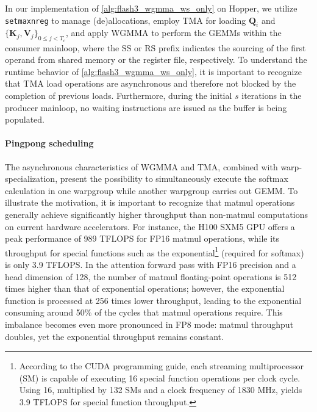 In our implementation of \cref{alg:flash3_wgmma_ws_only} on Hopper, we utilize \verb|setmaxnreg| to manage (de)allocations, employ TMA for loading $\mathbf{Q}_i$ and $\{ \mathbf{K}_j, \mathbf{V}_j \}_{0 \leq j < T_c}$, and apply WGMMA to perform the GEMMs within the consumer mainloop, where the SS or RS prefix indicates the sourcing of the first operand from shared memory or the register file, respectively. To understand the runtime behavior of \cref{alg:flash3_wgmma_ws_only}, it is important to recognize that TMA load operations are asynchronous and therefore not blocked by the completion of previous loads. Furthermore, during the initial $s$ iterations in the producer mainloop, no waiting instructions are issued as the buffer is being populated.

\paragraph{Pingpong scheduling} The asynchronous characteristics of WGMMA and TMA, combined with warp-specialization, present the possibility to simultaneously execute the softmax calculation in one warpgroup while another warpgroup carries out GEMM. To illustrate the motivation, it is important to recognize that matmul operations generally achieve significantly higher throughput than non-matmul computations on current hardware accelerators. For instance, the H100 SXM5 GPU offers a peak performance of 989 TFLOPS for FP16 matmul operations, while its throughput for special functions such as the exponential\footnote{According to the CUDA programming guide, each streaming multiprocessor (SM) is capable of executing 16 special function operations per clock cycle. Using 16, multiplied by 132 SMs and a clock frequency of 1830 MHz, yields 3.9 TFLOPS for special function throughput.} (required for softmax) is only 3.9 TFLOPS. In the attention forward pass with FP16 precision and a head dimension of 128, the number of matmul floating-point operations is 512 times higher than that of exponential operations; however, the exponential function is processed at 256 times lower throughput, leading to the exponential consuming around 50\% of the cycles that matmul operations require. This imbalance becomes even more pronounced in FP8 mode: matmul throughput doubles, yet the exponential throughput remains constant.

